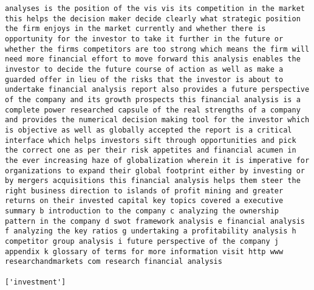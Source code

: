 \documentclass[11pt]{article}
\begin{document}
\begin{Verbatim}[commandchars=\\\{\}]
analyses is the position of the vis vis its competition in the market this helps the decision maker decide clearly what strategic position the firm enjoys in the market currently and whether there is opportunity for the investor to take it further in the future or whether the firms competitors are too strong which means the firm will need more financial effort to move forward this analysis enables the investor to decide the future course of action as well as make a guarded offer in lieu of the risks that the investor is about to undertake financial analysis report also provides a future perspective of the company and its growth prospects this financial analysis is a complete power researched capsule of the real strengths of a company and provides the numerical decision making tool for the investor which is objective as well as globally accepted the report is a critical interface which helps investors sift through opportunities and pick the correct one as per their risk appetites and financial acumen in the ever increasing haze of globalization wherein it is imperative for organizations to expand their global footprint either by investing or by mergers acquisitions this financial analysis helps them steer the right business direction to islands of profit mining and greater returns on their invested capital key topics covered a executive summary b introduction to the company c analyzing the ownership pattern in the company d swot framework analysis e financial analysis f analyzing the key ratios g undertaking a profitability analysis h competitor group analysis i future perspective of the company j appendix k glossary of terms for more information visit http www researchandmarkets com research financial analysis

['investment']

    \end{Verbatim}
\end{document}

